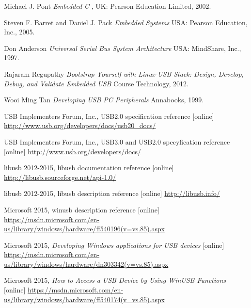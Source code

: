 \documentclass{BscUS}
\begin{document}
\begin{thebibliography}{1}

 Michael J. Pont {\em Embedded C       },  UK: Pearson Education Limited, 2002.

 Steven F. Barret and Daniel J. Pack {\em Embedded Systems} USA: Pearson Education, Inc., 2005.

 Don Anderson {\em Universal Serial Bus System Architecture } USA: MindShare, Inc., 1997.

 Rajaram Regupathy {\em Bootstrap Yourself with Linux-USB Stack: Design, Develop, Debug, and Validate Embedded USB } Course Technology, 2012.

 Wooi Ming Tan {\em Developing USB PC Peripherals } Annabooks, 1999.

 USB Implementers Forum, Inc., USB2.0 specification reference [online] 
\newline 
\url{http://www.usb.org/developers/docs/usb20_docs/}

 USB Implementers Forum, Inc., USB3.0 and USB2.0 specyfication reference [online] 
\newline 
\url{http://www.usb.org/developers/docs/}

 libusb 2012-2015, libusb documentation reference [online]
\newline 
\url{http://libusb.sourceforge.net/api-1.0/}

 libusb 2012-2015, libusb description reference [online]
\newline 
\url{http://libusb.info/}


 Microsoft 2015, winusb description reference [online]
\newline 
\url{https://msdn.microsoft.com/en-us/library/windows/hardware/ff540196(v=vs.85).aspx}

 Microsoft 2015, {\em Developing Windows applications for USB devices} [online]
\newline 
\url{https://msdn.microsoft.com/en-us/library/windows/hardware/dn303342(v=vs.85).aspx}

 Microsoft 2015, {\em How to Access a USB Device by Using WinUSB Functions} [online]
\newline 
\url{https://msdn.microsoft.com/en-us/library/windows/hardware/ff540174(v=vs.85).aspx}


\end{thebibliography}
\end{document}
